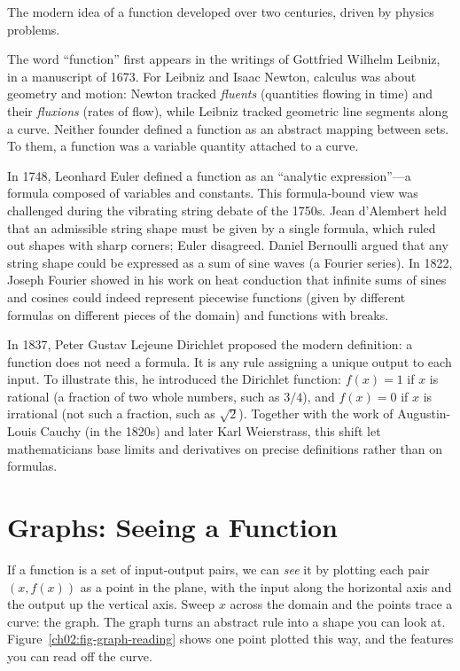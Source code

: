\begin{historybox}
The modern idea of a function developed over two centuries, driven by physics problems.

The word ``function'' first appears in the writings of Gottfried Wilhelm Leibniz, in a manuscript of 1673.
For Leibniz and Isaac Newton, calculus was about geometry and motion: Newton tracked
\emph{fluents} (quantities flowing in time) and their \emph{fluxions} (rates of flow),
while Leibniz tracked geometric line segments along a curve. Neither founder defined a
function as an abstract mapping between sets. To them, a function was a variable quantity
attached to a curve.

In 1748, Leonhard Euler defined a function as an ``analytic expression''---a formula composed
of variables and constants. This formula-bound view was challenged during the vibrating string
debate of the 1750s. Jean d'Alembert held that an admissible string shape must be given by a
single formula, which ruled out shapes with sharp corners; Euler disagreed. Daniel Bernoulli argued that any
string shape could be expressed as a sum of sine waves (a Fourier series). In 1822, Joseph
Fourier showed in his work on heat conduction that infinite sums of sines and cosines could
indeed represent piecewise functions (given by different formulas on different pieces of the
domain) and functions with breaks.

In 1837, Peter Gustav Lejeune Dirichlet proposed the modern definition: a function does not
need a formula. It is any rule assigning a unique output to each input. To illustrate
this, he introduced the Dirichlet function: $f(x) = 1$ if $x$ is rational (a fraction of
two whole numbers, such as $3/4$), and $f(x) = 0$ if $x$ is irrational (not such a
fraction, such as $\sqrt{2}$). Together with the work of Augustin-Louis Cauchy (in the 1820s)
and later Karl Weierstrass, this shift let mathematicians base limits and derivatives on precise
definitions rather than on formulas.
\end{historybox}

\section{Graphs: Seeing a Function}
\label{ch02:graphs}

If a function is a set of input-output pairs, we can \emph{see} it by plotting each
pair $(x, f(x))$ as a point in the plane, with the input along the horizontal axis
and the output up the vertical axis. Sweep $x$ across the domain and the points
trace a curve: the graph. The graph turns an abstract rule into a shape you can
look at. Figure~\ref{ch02:fig-graph-reading} shows one point plotted this way, and
the features you can read off the curve.

